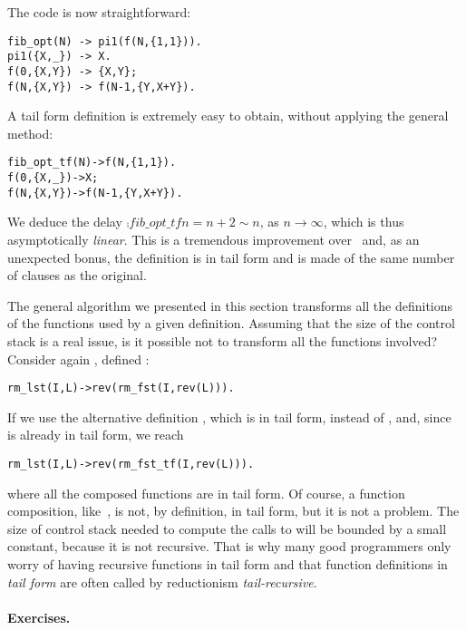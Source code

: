 The \Erlang code is now straightforward:
\begin{verbatim}
fib_opt(N) -> pi1(f(N,{1,1})).
pi1({X,_}) -> X.
f(0,{X,Y}) -> {X,Y};
f(N,{X,Y}) -> f(N-1,{Y,X+Y}).
\end{verbatim}
A tail form definition is extremely easy to obtain, without applying
the general method:
\begin{alltt}
fib_opt_tf(N) -> f(N,\{1,1\}).
f(0,\{X,_\})    -> X;\hfill% \emph{Projection done here}
f(N,\{X,Y\})    -> f(N-1,\{Y,X+Y\}).
\end{alltt}
We deduce the delay \(\comp{fib\_opt\_tf}{n} = n + 2 \mathrel{\sim}
n\), as \(n \rightarrow \infty\), which is thus asymptotically
\emph{linear}. This is a tremendous improvement over~
and, as an unexpected bonus, the definition is in tail form and is
made of the same number of clauses as the original.

The general algorithm we presented in this section transforms all the
definitions of the functions used by a given definition. Assuming that
the size of the control stack is a real issue, is it possible not to
transform all the functions involved? Consider again
, defined :
\begin{alltt}
rm_lst(I,L) -> rev(rm_fst(I,rev(L))).
\end{alltt}
If we use the alternative definition , which is
in tail form, instead of , and,
since~ is already in tail form, we reach
\begin{alltt}
rm_lst(I,L) -> rev(rm_fst_tf(I,rev(L))).
\end{alltt}
where all the composed functions are in tail form. Of course, a
function composition, like~, is not, by definition,
in tail form, but it is not a problem. The size of control stack
needed to compute the calls to  will be bounded by
a small constant, because it is not recursive. That is why many good
programmers only worry of having recursive functions in tail form and
that function definitions in \emph{tail form} are often called by
reductionism \emph{tail\hyp{}recursive}.

\medskip

\paragraph{Exercises.}
\label{ex:delay_and_tail_form_revisited}

